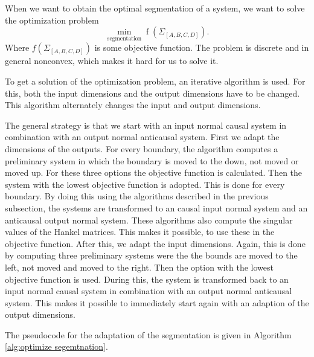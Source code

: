 \documentclass[doctype=mastersthesis,BCOR=15mm,biblatex]{ldvbook}%
\DeclareMathOperator{\f}{f}
\begin{document}
When we want to obtain the optimal segmentation of a system, 
we want to solve the optimization problem
\begin{equation}
\underset{\text{segmentation}}{\min} \f(\Sigma_{[A,B,C,D]})
.
\end{equation}
Where $f(\Sigma_{[A,B,C,D]})$ is some objective function.
The problem is discrete and in general nonconvex, which makes it hard for us to solve it.

To get a solution of the optimization problem, an iterative algorithm is used.
For this, both the input dimensions and the output dimensions have to be changed.
This algorithm alternately changes the input and output dimensions.

The general strategy is that we start with an input normal causal system in combination with an output normal anticausal system.
First we adapt the dimensions of the outputs.
For every boundary, the algorithm computes a preliminary system in which the boundary is moved to the down, not moved or moved up.
For these three options the objective function is calculated. 
Then the system with the lowest objective function is adopted.
This is done for every boundary.
By doing this using the algorithms described in the previous subsection, the systems are transformed to an causal input normal system and an anticausal output normal system.
These algorithms also compute the singular values of the Hankel matrices. This makes it possible, to use these in the objective function.
After this, we adapt the input dimensions.
Again, this is done by computing three preliminary systems were the 
 the bounds are moved to the left, not moved and moved to the right.
Then the option with the lowest objective function is used.
During this, the system is transformed back to an input normal causal system in combination with an output normal anticausal system.
This makes it possible to immediately start again with an adaption of the output dimensions.

The pseudocode for the adaptation of the segmentation is given in Algorithm\,\ref{alg:optimize segemtnation}.
\end{document}
